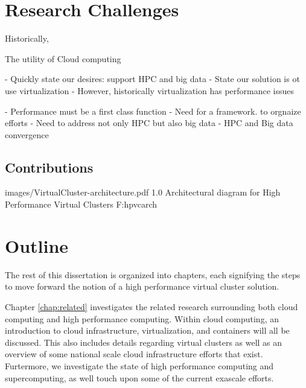 \section{Research Challenges}
\label{sec:chall}

Historically, 

The utility of Cloud computing


- Quickly state our desires: support HPC and big data
- State our solution is ot use virtualization
- However, historically virtualization has performance issues



- Performance must be a first class function
- Need for a framework.  to orgnaize efforts
- Need to address not only HPC but also big data
- HPC and Big data convergence 


\subsection{Contributions}


  {images/VirtualCluster-architecture.pdf}
  {1.0}
  {Architectural diagram for High Performance Virtual Clusters}
  {F:hpvcarch}


\section{Outline}
\label{sec:outline}


The rest of this dissertation is organized into chapters, each signifying the steps to move forward the notion of a high performance virtual cluster solution.

Chapter \ref{chap:related} investigates the related research surrounding both cloud computing and high performance computing. Within cloud computing, an introduction to cloud infrastructure, virtualization, and containers will all be discussed. This also includes details regarding virtual clusters as well as an overview of some national scale cloud infrastructure efforts that exist. Furtermore, we investigate the state of high performance computing and supercomputing, as well touch upon some of the current exascale efforts.

